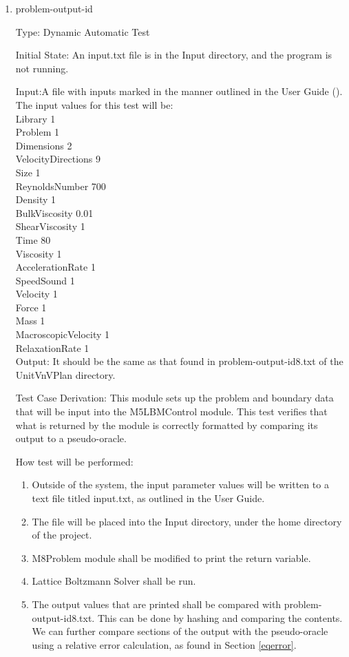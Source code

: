 \documentclass[12pt, titlepage]{article}
\newcommand{\myprogname}{Lattice Boltzmann Solver}
\newcounter{uvtestcounter} %
\begin{document}
\begin{enumerate}
	
	\item{problem-output-id\theuvtestcounter\\}
	
	Type: Dynamic Automatic Test
	
Initial State: An input.txt file is in the Input directory, and the program is not running.

Input:A file with inputs marked in the manner outlined in the
User Guide (\citet{LBM_UserGuide_PM}).\\The input values for this test will
be:\\

Library 1\\
Problem 1\\
Dimensions 2\\
VelocityDirections 9\\
Size 1\\
ReynoldsNumber 700\\
Density 1\\
BulkViscosity 0.01\\
ShearViscosity 1\\
Time 80\\
Viscosity 1\\
AccelerationRate 1\\
SpeedSound 1\\
Velocity 1\\
Force 1\\
Mass 1\\
MacroscopicVelocity 1\\
RelaxationRate 1\\
	
	Output: It should be the same as that found in problem-output-id8.txt of the UnitVnVPlan directory.

Test Case Derivation: This module sets up the problem and boundary data that will be input into the M5LBMControl module. This test verifies that what is returned by the module is correctly formatted by comparing its output to a pseudo-oracle.

How test will be performed: 
\begin{enumerate}
	\item Outside of the system, the input parameter values will be written to a text file titled input.txt, as outlined in the User Guide.
	\item The file will be placed into the Input directory, under the home directory of the project.
	\item M8Problem module shall be modified to print the return variable.
	\item {\myprogname} shall be run. 
	\item The output values that are printed shall be compared with problem-output-id8.txt. This can be done by hashing and comparing the contents. We can further compare sections of the output with the pseudo-oracle using a relative error calculation, as found in Section \ref{eqerror}.
\end{enumerate}
	 
\end{enumerate}
\end{document}
